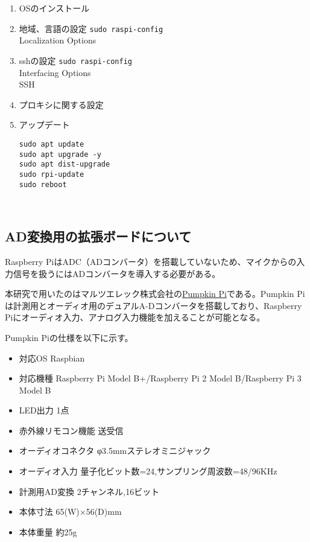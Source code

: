 \begin{enumerate}
\def\labelenumi{\arabic{enumi}.}
\item
  OSのインストール
\item
  地域、言語の設定 \texttt{sudo\ raspi-config}\\
  Localization Options
\item
  sshの設定 \texttt{sudo\ raspi-config}\\
  Interfacing Options\\
  SSH
\item
  プロキシに関する設定
\item
  アップデート

\begin{verbatim}
sudo apt update 
sudo apt upgrade -y 
sudo apt dist-upgrade
sudo rpi-update
sudo reboot
\end{verbatim}
\end{enumerate}

\
\subsection{AD変換用の拡張ボードについて}\label{about-adc}

Raspberry
PiはADC（ADコンバータ）を搭載していないため、マイクからの入力信号を扱うにはADコンバータを導入する必要がある。

本研究で用いたのはマルツエレック株式会社の\href{http://select.marutsu.co.jp/list/detail.php?id=258}{Pumpkin
Pi}である。Pumpkin
Piは計測用とオーディオ用のデュアルA-Dコンバータを搭載しており、Raspberry
Piにオーディオ入力、アナログ入力機能を加えることが可能となる。

Pumpkin Piの仕様を以下に示す。

\begin{itemize}
\tightlist
\item
  対応OS Raspbian
\item
  対応機種 Raspberry Pi Model B+/Raspberry Pi 2 Model B/Raspberry Pi 3
  Model B
\item
  LED出力 1点
\item
  赤外線リモコン機能 送受信
\item
  オーディオコネクタ φ3.5mmステレオミニジャック
\item
  オーディオ入力 量子化ビット数=24,サンプリング周波数=48/96KHz
\item
  計測用AD変換 2チャンネル,16ビット
\item
  本体寸法 65(W)×56(D)mm
\item
  本体重量 約25g
\end{itemize}

